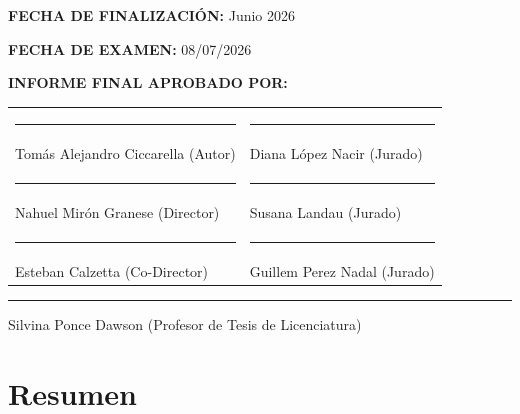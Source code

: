 \documentclass[letterpaper,12pt]{report}
\begin{document}
\vspace{0.2cm}

\noindent
\textbf{FECHA DE FINALIZACIÓN:} Junio 2026

\vspace{0.2cm}

\noindent
\textbf{FECHA DE EXAMEN:} 08/07/2026

\vspace{0.2cm}

\noindent
\textbf{INFORME FINAL APROBADO POR:}

\vspace{1 cm}

\vfill

\begin{center}
\begin{table}[h]
\begin{tabular}{ll}
\rule{70mm}{0.1mm}      \hspace{1.5cm}           & \rule{70mm}{0.1mm} \\
\vspace{1.5 cm}
Tomás Alejandro Ciccarella (Autor)                              & Diana López Nacir (Jurado) \\
\rule{70mm}{0.1mm}      \hspace{1.5cm}            & \rule{70mm}{0.1mm} \\
\vspace{1.5 cm}
Nahuel Mirón Granese (Director)                         & Susana Landau (Jurado)   \\ 
\rule{70mm}{0.1mm}       \hspace{1.5cm}           & \rule{70mm}{0.1mm} \\
\vspace{1.0 cm}
Esteban Calzetta (Co-Director) & Guillem Perez Nadal (Jurado)   \\
\end{tabular}
\end{table}

\rule{110mm}{0.1mm} 

Silvina Ponce Dawson (Profesor de Tesis de Licenciatura)

\end{center}

\newpage
\cleardoublepage
{} %
\pagestyle{plain}     %

\section*{Resumen}
\end{document}
